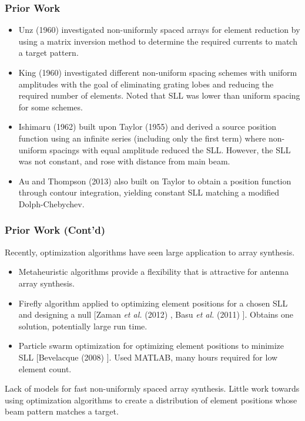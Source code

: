 \documentclass[...]{beamer}
\begin{document}
\begin{frame}
  \frametitle{Prior Work}

  \begin{itemize}
    \item Unz (1960) \cite{Unz1960} investigated non-uniformly spaced arrays for element reduction by using a matrix inversion method to determine the required currents to match a target pattern.
    \item King (1960) \cite{King1960} investigated different non-uniform spacing schemes with uniform amplitudes with the goal of eliminating grating lobes and reducing the required number of elements.  Noted that SLL was lower than uniform spacing for some schemes.
    \item Ishimaru (1962) \cite{Ishimaru1962} built upon Taylor (1955) \cite{Taylor1955} and derived a source position function using an infinite series (including only the first term) where non-uniform spacings with equal amplitude reduced the SLL.  However, the SLL was not constant, and rose with distance from main beam.
    \item Au and Thompson (2013) \cite{Au2013} also built on Taylor to obtain a position function through contour integration, yielding constant SLL matching a modified Dolph-Chebychev.
  \end{itemize}

\end{frame}

\begin{frame}
  \frametitle{Prior Work (Cont'd)}
  Recently, optimization algorithms have seen large application to array synthesis.

  \begin{itemize}
    \item Metaheuristic algorithms provide a flexibility that is attractive for antenna array synthesis.
    \item Firefly algorithm applied to optimizing element positions for a chosen SLL and designing a null [Zaman \textit{et al.} (2012) \cite{Zaman2012}, Basu \textit{et al.} (2011) \cite{Basu2011}].  Obtains one solution, potentially large run time.
    \item Particle swarm optimization for optimizing element positions to minimize SLL [Bevelacque (2008) \cite{Bevelacqua2008}].  Used MATLAB, many hours required for low element count.
  \end{itemize}

  Lack of models for fast non-uniformly spaced array synthesis.  Little work towards using optimization algorithms to create a distribution of element positions whose beam pattern matches a target.

\end{frame}
\end{document}
